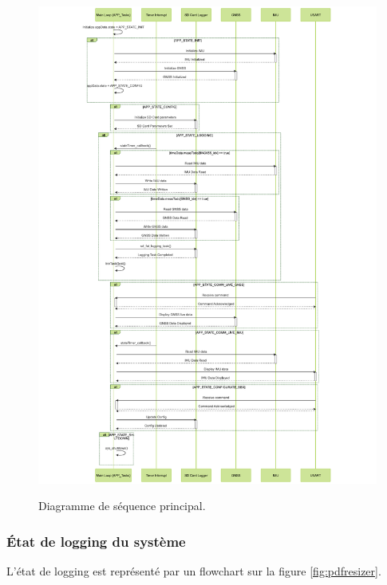 \begin{figure}[!h]
	\centering
\	\includegraphics[width=.95\linewidth]{../figures/code/diagrammes/sequence-app}
	\caption{Diagramme de séquence principal.}
	\label{fig:sequence-app}
\end{figure}

\clearpage
\subsubsection{État de logging du système}
L'état de logging est représenté par un flowchart sur la figure \ref{fig:pdfresizer}.

